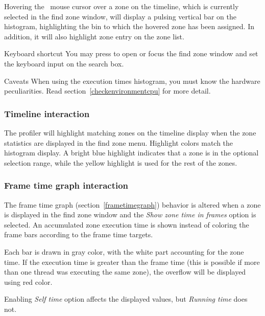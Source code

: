 \documentclass[hidelinks,titlepage,a4paper,twoside]{article}
\begin{document}
Hovering the \faArrowPointer{}~mouse cursor over a zone on the timeline, which is currently selected in the find zone window, will display a pulsing vertical bar on the histogram, highlighting the bin to which the hovered zone has been assigned. In addition, it will also highlight zone entry on the zone list.

\begin{bclogo}[
noborder=true,
couleur=black!5,
logo=\bclampe
]{Keyboard shortcut}
You may press  to open or focus the find zone window and set the keyboard input on the search box.
\end{bclogo}

\begin{bclogo}[
noborder=true,
couleur=black!5,
logo=\bcattention
]{Caveats}
When using the execution times histogram, you must know the hardware peculiarities. Read section~\ref{checkenvironmentcpu} for more detail.
\end{bclogo}

\subsubsection{Timeline interaction}

The profiler will highlight matching zones on the timeline display when the zone statistics are displayed in the find zone menu. Highlight colors match the histogram display. A bright blue highlight indicates that a zone is in the optional selection range, while the yellow highlight is used for the rest of the zones.

\subsubsection{Frame time graph interaction}
\label{frametimefindzone}

The frame time graph (section~\ref{frametimegraph}) behavior is altered when a zone is displayed in the find zone window and the \emph{Show zone time in frames} option is selected. An accumulated zone execution time is shown instead of coloring the frame bars according to the frame time targets.

Each bar is drawn in gray color, with the white part accounting for the zone time. If the execution time is greater than the frame time (this is possible if more than one thread was executing the same zone), the overflow will be displayed using red color.

Enabling \emph{Self time} option affects the displayed values, but \emph{Running time} does not.
\end{document}
